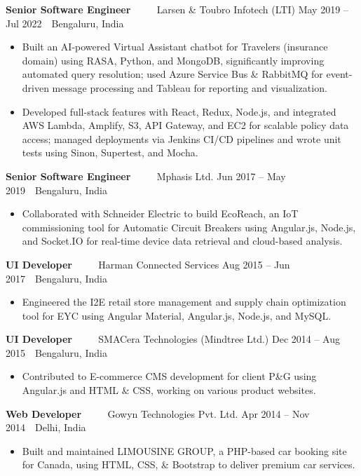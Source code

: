 \documentclass[10pt, letterpaper]{article}
\newcommand{\jobtitle}[4]{%
  \vspace{1pt}
  \noindent
  {\fontsize{11}{13}\bfseries\color{textmain}#1}
  {\color{textmuted}\ \ \textbar\ \ }
  {\color{textmuted}#2}
  \hfill
  {\fontsize{9.5}{11}\color{textmuted}#3\ \textperiodcentered\ #4}
  \vspace{1pt}
}
\begin{document}
\jobtitle{Senior Software Engineer}{Larsen \& Toubro Infotech (LTI)}{May 2019 -- Jul 2022}{Bengaluru, India}
\begin{itemize}
  \item Built an AI-powered Virtual Assistant chatbot for Travelers (insurance domain) using RASA, Python, and MongoDB, significantly improving automated query resolution; used Azure Service Bus \& RabbitMQ for event-driven message processing and Tableau for reporting and visualization.
  \item Developed full-stack features with React, Redux, Node.js, and integrated AWS Lambda, Amplify, S3, API Gateway, and EC2 for scalable policy data access; managed deployments via Jenkins CI/CD pipelines and wrote unit tests using Sinon, Supertest, and Mocha.
\end{itemize}

\jobtitle{Senior Software Engineer}{Mphasis Ltd.}{Jun 2017 -- May 2019}{Bengaluru, India}
\begin{itemize}
  \item Collaborated with Schneider Electric to build EcoReach, an IoT commissioning tool for Automatic Circuit Breakers using Angular.js, Node.js, and Socket.IO for real-time device data retrieval and cloud-based analysis.
\end{itemize}

\jobtitle{UI Developer}{Harman Connected Services}{Aug 2015 -- Jun 2017}{Bengaluru, India}
\begin{itemize}
  \item Engineered the I2E retail store management and supply chain optimization tool for EYC using Angular Material, Angular.js, Node.js, and MySQL.
\end{itemize}

\jobtitle{UI Developer}{SMACera Technologies (Mindtree Ltd.)}{Dec 2014 -- Aug 2015}{Bengaluru, India}
\begin{itemize}
  \item Contributed to E-commerce CMS development for client P\&G using Angular.js and HTML \& CSS, working on various product websites.
\end{itemize}

\jobtitle{Web Developer}{Gowyn Technologies Pvt. Ltd.}{Apr 2014 -- Nov 2014}{Delhi, India}
\begin{itemize}
  \item Built and maintained LIMOUSINE GROUP, a PHP-based car booking site for Canada, using HTML, CSS, \& Bootstrap to deliver premium car services.
\end{itemize}
\end{document}
